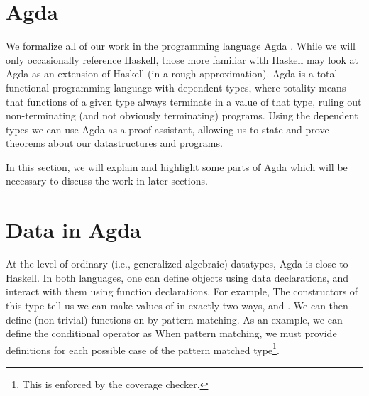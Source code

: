 \section{Agda}\label{sec:background-agda}
We formalize all of our work in the programming language Agda \cite{agda}. While we will only occasionally reference Haskell, those more familiar with Haskell may look at Agda as an extension of Haskell (in a rough approximation). Agda is a total functional programming language with dependent types, where totality means that functions of a given type always terminate in a value of that type, ruling out non-terminating (and not obviously terminating) programs. Using the dependent types we can use Agda as a proof assistant, allowing us to state and prove theorems about our datastructures and programs. 

In this section, we will explain and highlight some parts of Agda which will be necessary to discuss the work in later sections.


\section{Data in Agda}\label{sec:background-data}
At the level of ordinary (i.e., generalized algebraic) datatypes, Agda is close to Haskell. In both languages, one can define objects using data declarations, and interact with them using function declarations. For example,
The constructors of this type tell us we can make values of  in exactly two ways,  and . We can then define (non-trivial) functions on  by pattern matching. As an example, we can define the conditional operator as
When pattern matching, we must provide definitions for each possible case of the pattern matched type\footnote{This is enforced by the coverage checker.}. 

